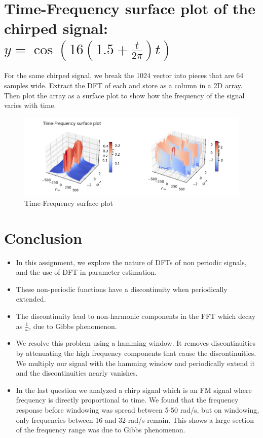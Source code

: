\documentclass{article}
\begin{document}
\newpage

\section{Time-Frequency surface plot of the chirped signal: $y = \cos\left(16\left(1.5+\frac{t}{2\pi}\right)t\right)$}
For the same chirped signal, we break the 1024 vector into pieces that are 64 samples wide.
Extract the DFT of each and store as a column in a 2D array. Then plot the array as a surface plot to show how the frequency of the signal varies with time.

\begin{figure}[h!]
\includegraphics[scale=0.7]{Figure_14.png}
\caption{Time-Frequency surface plot}
\label{fig:universe}
\end{figure}



\section{Conclusion}
\begin{itemize}
\item In this assignment, we explore the nature of DFTs of non periodic signals,
and the use of DFT in parameter estimation.
\item These non-periodic functions have a discontinuity when periodically extended.
\item The discontinuity lead to non-harmonic components in the FFT which decay as
\(\frac{1}{\omega}\), due to Gibbs phenomenon.
\item We resolve this problem using a hamming window. It removes discontinuities by attenuating the high frequency components that cause the discontinuities. We multiply our signal with the hamming window and periodically extend it and the discontinuities nearly vanishes.
\item In the last question we analyzed a chirp signal which is an FM signal where frequency is directly proportional to time. We found that the frequency response before windowing was spread between 5-50 rad/s, but on windowing, only frequencies between 16 and 32 rad/s remain. This shows a large section of the frequency range was due to Gibbs phenomenon.


\end{itemize}
\end{document}
